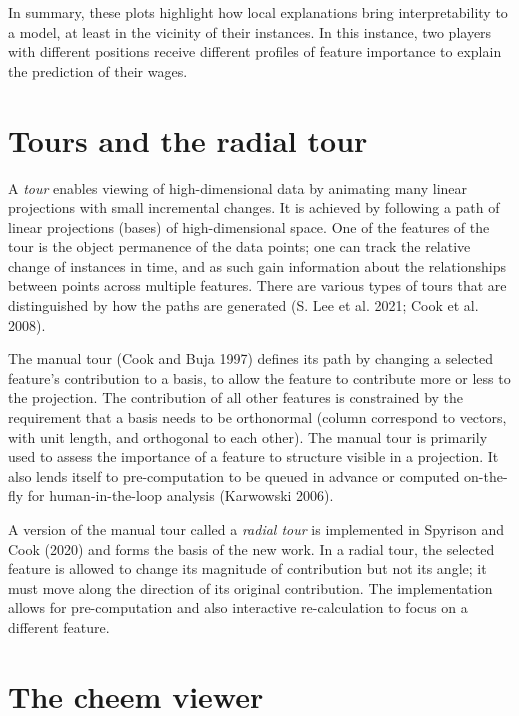 \documentclass[
]{article}
\begin{document}
In summary, these plots highlight how local explanations bring interpretability to a model, at least in the vicinity of their instances. In this instance, two players with different positions receive different profiles of feature importance to explain the prediction of their wages.

\hypertarget{sec:tour}{%
\section{Tours and the radial tour}\label{sec:tour}}

A \emph{tour} enables viewing of high-dimensional data by animating many linear projections with small incremental changes. It is achieved by following a path of linear projections (bases) of high-dimensional space. One of the features of the tour is the object permanence of the data points; one can track the relative change of instances in time, and as such gain information about the relationships between points across multiple features. There are various types of tours that are distinguished by how the paths are generated (S. Lee et al. 2021; Cook et al. 2008).

The manual tour (Cook and Buja 1997) defines its path by changing a selected feature's contribution to a basis, to allow the feature to contribute more or less to the projection. The contribution of all other features is constrained by the requirement that a basis needs to be orthonormal (column correspond to vectors, with unit length, and orthogonal to each other). The manual tour is primarily used to assess the importance of a feature to structure visible in a projection. It also lends itself to pre-computation to be queued in advance or computed on-the-fly for human-in-the-loop analysis (Karwowski 2006).

A version of the manual tour called a \emph{radial tour} is implemented in Spyrison and Cook (2020) and forms the basis of the new work. In a radial tour, the selected feature is allowed to change its magnitude of contribution but not its angle; it must move along the direction of its original contribution. The implementation allows for pre-computation and also interactive re-calculation to focus on a different feature.

\hypertarget{sec:applicationdesign}{%
\section{The cheem viewer}\label{sec:applicationdesign}}
\end{document}
